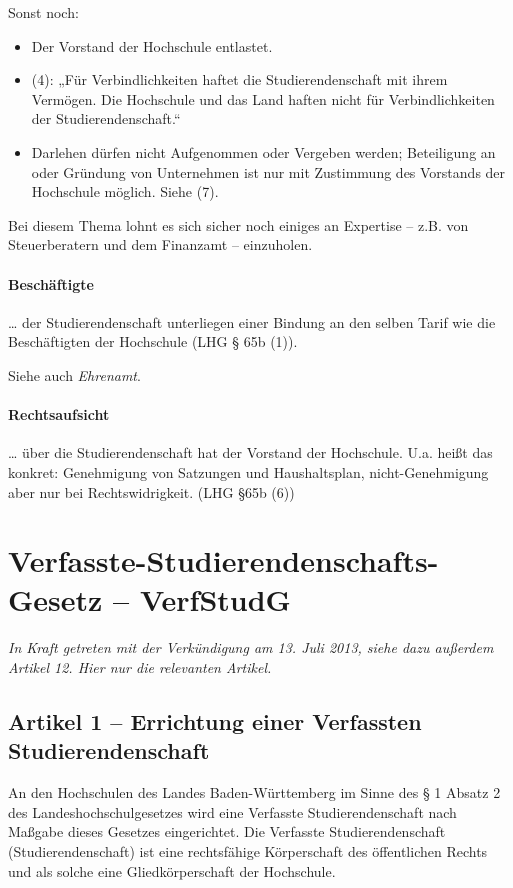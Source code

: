 \documentclass[
10pt,
a4paper,
twoside,								%
titlepage=false,							%
draft=false								%
]{scrartcl}
\begin{document}
Sonst noch:
\begin{itemize}
	\item Der Vorstand der Hochschule entlastet.
	\item (4): „Für Verbindlichkeiten haftet die Studierendenschaft mit ihrem Vermögen. Die Hochschule und das Land haften nicht für Verbindlichkeiten der Studierendenschaft.“
	\item Darlehen dürfen nicht Aufgenommen oder Vergeben werden; Beteiligung an oder Gründung von Unternehmen ist nur mit Zustimmung des Vorstands der Hochschule möglich. Siehe (7).
\end{itemize}

Bei diesem Thema lohnt es sich sicher noch einiges an Expertise – z.B. von Steuerberatern und dem Finanzamt – einzuholen.


\paragraph{Beschäftigte}

… der Studierendenschaft unterliegen einer Bindung an den selben Tarif wie die Beschäftigten der Hochschule (LHG § 65b (1)).

Siehe auch \emph{Ehrenamt}.


\paragraph{Rechtsaufsicht}

… über die Studierendenschaft hat der Vorstand der Hochschule. U.a. heißt das konkret: Genehmigung von Satzungen und Haushaltsplan, nicht-Genehmigung aber nur bei Rechtswidrigkeit. (LHG §65b (6))




\appendix


\section{Verfasste-Studierendenschafts-Gesetz – VerfStudG}

\emph{In Kraft getreten mit der Verkündigung am 13. Juli 2013, siehe dazu außerdem Artikel 12. Hier nur die relevanten Artikel.}

\subsection{Artikel 1 – Errichtung einer Verfassten Studierendenschaft}

An den Hochschulen des Landes Baden-Württemberg im Sinne des § 1 Absatz 2 des Landeshochschulgesetzes wird eine Verfasste Studierendenschaft 
nach Maßgabe dieses Gesetzes eingerichtet. Die Verfasste Studierendenschaft (Studierendenschaft) ist eine rechtsfähige Körperschaft des öffentlichen Rechts und als solche eine Gliedkörperschaft der Hochschule.
\end{document}
